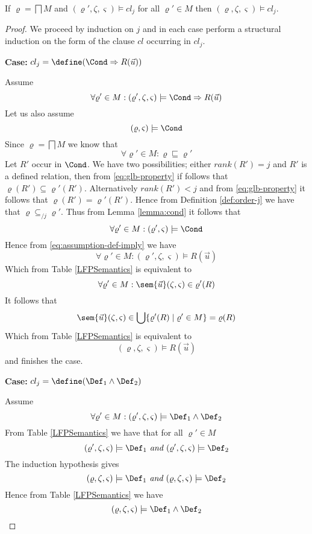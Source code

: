 \begin{lemma}\label{lemma:cl}
  If $\varrho=\bigsqcap M$ and $(\varrho', \zeta, \varsigma) \models
  cl_j$ for all $\varrho' \in M$ then $(\varrho,\zeta, \varsigma)
  \models cl_j$.
\end{lemma}
\begin{proof}
We proceed by induction on $j$ and in each case perform a structural
induction on the form of the clause $cl$ occurring in $cl_j$.

\noindent\textbf{Case: }$cl_j=\define(\Cond \Rightarrow R(\vec u))$

\noindent Assume
\begin{equation}
  \forall \varrho' \in M: (\varrho',\zeta,\varsigma) \models \Cond
  \Rightarrow R(\vec u) \label{eq:assumption-def-imply}
\end{equation}
Let us also assume
$$
(\varrho,\varsigma) \models \Cond
$$
Since $\varrho=\bigsqcap M$ we know that
\begin{equation}
\forall \varrho' \in M: \varrho \sqsubseteq \varrho' \label{eq:glb-property}
\end{equation}
Let $R'$ occur in $\Cond$. We have two possibilities; either
$rank(R')=j$ and $R'$ is a defined relation, then from
\eqref{eq:glb-property} if follows that $\varrho(R') \subseteq
\varrho'(R')$. Alternatively $rank(R')<j$ and from
\eqref{eq:glb-property} it follows that $\varrho(R') =
\varrho'(R')$. Hence from Definition \ref{def:order-j} we have that
$\varrho \subseteq_{/j} \varrho'$. Thus from Lemma \ref{lemma:cond} it
follows that
$$
\forall \varrho' \in M: (\varrho',\varsigma) \models \Cond
$$
Hence from \eqref{eq:assumption-def-imply} we have
$$
\forall \varrho' \in M: (\varrho',\zeta,\varsigma) \models R(\vec u)
$$
Which from Table \ref{LFPSemantics} is equivalent to
$$
\forall \varrho' \in M: \sem{\vec u}(\zeta, \varsigma) \in \varrho'(R)
$$
It follows that
$$
\sem{\vec u}(\zeta, \varsigma) \in \bigcup \{ \varrho'(R) \mid \varrho' \in M \} = \varrho(R)
$$
Which from Table \ref{LFPSemantics} is equivalent to
$$
(\varrho,\zeta,\varsigma) \models R(\vec u)
$$
and finishes the case.

\noindent\textbf{Case: }$cl_j=\define(\Def_1 \wedge \Def_2)$

\noindent Assume
$$
  \forall \varrho' \in M: (\varrho',\zeta,\varsigma) \models \Def_1 \wedge \Def_2
$$
From Table \ref{LFPSemantics} we have that for all $\varrho' \in M$
$$
(\varrho',\zeta,\varsigma) \models \Def_1 \textit{ and } (\varrho',\zeta,\varsigma)
\models \Def_2
$$
The induction hypothesis gives
$$
(\varrho,\zeta,\varsigma) \models \Def_1 \textit{ and } (\varrho,\zeta,\varsigma)
\models \Def_2
$$
Hence from Table \ref{LFPSemantics} we have
$$
(\varrho,\zeta,\varsigma) \models \Def_1 \wedge \Def_2
$$


\end{proof}
